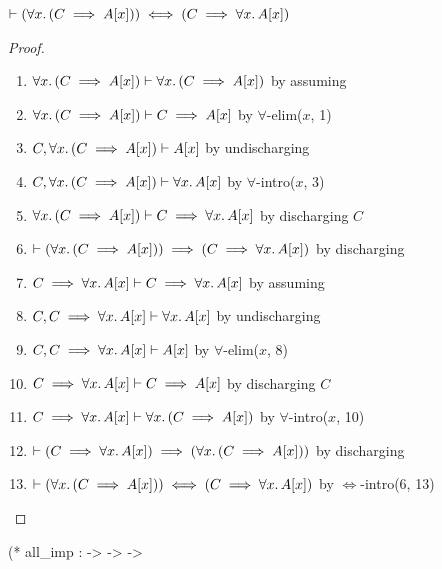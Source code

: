 \begin{node}
$\vdash(\forall x\ldotp(C\implies A[x]))\iff(C\implies\forall x\ldotp A[x])$
\end{node}

\begin{proof}
\begin{enumerate}
\item $\forall x\ldotp(C\implies A[x])\vdash\forall x\ldotp(C\implies A[x])$
by assuming%
\item $\forall x\ldotp(C\implies A[x])\vdash C\implies A[x]$
  by $\forall$-elim($x$, 1)%
\item $C,\forall x\ldotp(C\implies A[x])\vdash A[x]$
  by undischarging%
\item $C,\forall x\ldotp(C\implies A[x])\vdash\forall x\ldotp A[x]$
  by $\forall$-intro($x$, 3)%
\item $\forall x\ldotp(C\implies A[x])\vdash C\implies\forall x\ldotp A[x]$
  by discharging $C$%
\item $\vdash(\forall x\ldotp(C\implies A[x]))\implies(C\implies\forall x\ldotp A[x])$
  by discharging%
\item $C\implies\forall x\ldotp A[x]\vdash C\implies\forall x\ldotp A[x]$
  by assuming%
\item $C,C\implies\forall x\ldotp A[x]\vdash\forall x\ldotp A[x]$
  by undischarging%
\item $C,C\implies\forall x\ldotp A[x]\vdash A[x]$
  by $\forall$-elim($x$, 8)%
\item $C\implies\forall x\ldotp A[x]\vdash C\implies A[x]$
  by discharging $C$%
\item $C\implies\forall x\ldotp A[x]\vdash\forall x\ldotp(C\implies A[x])$
  by $\forall$-intro($x$, 10)%
\item $\vdash(C\implies\forall x\ldotp A[x])\implies(\forall x\ldotp(C\implies A[x]))$
  by discharging%
\item $\vdash(\forall x\ldotp(C\implies A[x]))\iff(C\implies\forall x\ldotp A[x])$
  by $\Leftrightarrow$-intro(6, 13)\qedhere%
\end{enumerate}
\end{proof}

\nwenddocs{}\plusendmoddef\nwstartdeflinemarkup{}\nwenddeflinemarkup
(* all_imp :  ->  ->  -> 

